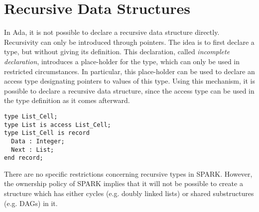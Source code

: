 \documentclass[runningheads]{llncs}
\begin{document}
\section{Recursive Data Structures}
In Ada, it is not possible to declare a recursive data structure directly. Recursivity can only be introduced through pointers. The idea is to first declare a type, but without giving its definition. This declaration, called \emph{incomplete declaration}, introduces a place-holder for the type, which can only be used in restricted circumstances. In particular, this place-holder can be used to declare an access type designating pointers to values of this type. %
Using this mechanism, it is possible to declare a recursive data structure, since the access type can be used in the type definition as it comes afterward.
\begin{lstlisting}
type List_Cell;
type List is access List_Cell;
type List_Cell is record
  Data : Integer;
  Next : List;
end record;
\end{lstlisting}
There are no specific restrictions concerning recursive types in SPARK. However, the ownership policy of SPARK implies that it will not be possible to create a structure which has either cycles (e.g. doubly linked lists) or shared substructures (e.g. DAGs) in it.
\end{document}
